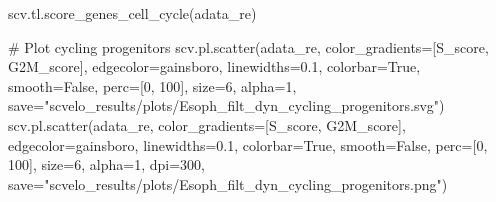 \documentclass[
  letterpaper,
  DIV=11,
  numbers=noendperiod]{scrreprt}
\newenvironment{Shaded}{\begin{snugshade}}{\end{snugshade}}
\newcommand{\CommentTok}[1]{\textcolor[rgb]{0.37,0.37,0.37}{#1}}
\newcommand{\DecValTok}[1]{\textcolor[rgb]{0.68,0.00,0.00}{#1}}
\newcommand{\FloatTok}[1]{\textcolor[rgb]{0.68,0.00,0.00}{#1}}
\newcommand{\NormalTok}[1]{\textcolor[rgb]{0.00,0.23,0.31}{#1}}
\newcommand{\OperatorTok}[1]{\textcolor[rgb]{0.37,0.37,0.37}{#1}}
\newcommand{\StringTok}[1]{\textcolor[rgb]{0.13,0.47,0.30}{#1}}
\newcommand{\VariableTok}[1]{\textcolor[rgb]{0.07,0.07,0.07}{#1}}
\begin{document}
\begin{Shaded}
\begin{Highlighting}[]
\NormalTok{scv.tl.score\_genes\_cell\_cycle(adata\_re)}

\CommentTok{\# Plot cycling progenitors}
\NormalTok{scv.pl.scatter(adata\_re, color\_gradients}\OperatorTok{=}\NormalTok{[}\StringTok{\textquotesingle{}S\_score\textquotesingle{}}\NormalTok{, }\StringTok{\textquotesingle{}G2M\_score\textquotesingle{}}\NormalTok{], edgecolor}\OperatorTok{=}\StringTok{\textquotesingle{}gainsboro\textquotesingle{}}\NormalTok{, linewidths}\OperatorTok{=}\FloatTok{0.1}\NormalTok{, colorbar}\OperatorTok{=}\VariableTok{True}\NormalTok{, smooth}\OperatorTok{=}\VariableTok{False}\NormalTok{, perc}\OperatorTok{=}\NormalTok{[}\DecValTok{0}\NormalTok{, }\DecValTok{100}\NormalTok{], size}\OperatorTok{=}\DecValTok{6}\NormalTok{, alpha}\OperatorTok{=}\DecValTok{1}\NormalTok{, save}\OperatorTok{=}\StringTok{"scvelo\_results/plots/Esoph\_filt\_dyn\_cycling\_progenitors.svg"}\NormalTok{)}
\NormalTok{scv.pl.scatter(adata\_re, color\_gradients}\OperatorTok{=}\NormalTok{[}\StringTok{\textquotesingle{}S\_score\textquotesingle{}}\NormalTok{, }\StringTok{\textquotesingle{}G2M\_score\textquotesingle{}}\NormalTok{], edgecolor}\OperatorTok{=}\StringTok{\textquotesingle{}gainsboro\textquotesingle{}}\NormalTok{, linewidths}\OperatorTok{=}\FloatTok{0.1}\NormalTok{, colorbar}\OperatorTok{=}\VariableTok{True}\NormalTok{, smooth}\OperatorTok{=}\VariableTok{False}\NormalTok{, perc}\OperatorTok{=}\NormalTok{[}\DecValTok{0}\NormalTok{, }\DecValTok{100}\NormalTok{], size}\OperatorTok{=}\DecValTok{6}\NormalTok{, alpha}\OperatorTok{=}\DecValTok{1}\NormalTok{, dpi}\OperatorTok{=}\DecValTok{300}\NormalTok{, save}\OperatorTok{=}\StringTok{"scvelo\_results/plots/Esoph\_filt\_dyn\_cycling\_progenitors.png"}\NormalTok{)}


\end{Highlighting}
\end{Shaded}
\end{document}
